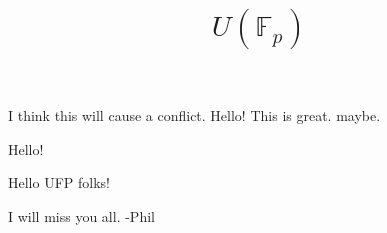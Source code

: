 \documentclass{amsart}
\begin{document}
I think this will cause a conflict. 
 Hello! This is great. maybe. 


    \title{$U(\mathbb{F}_p)$}



    \maketitle

 Hello!

 Hello UFP folks!
 
 I will miss you all. -Phil
\end{document}

